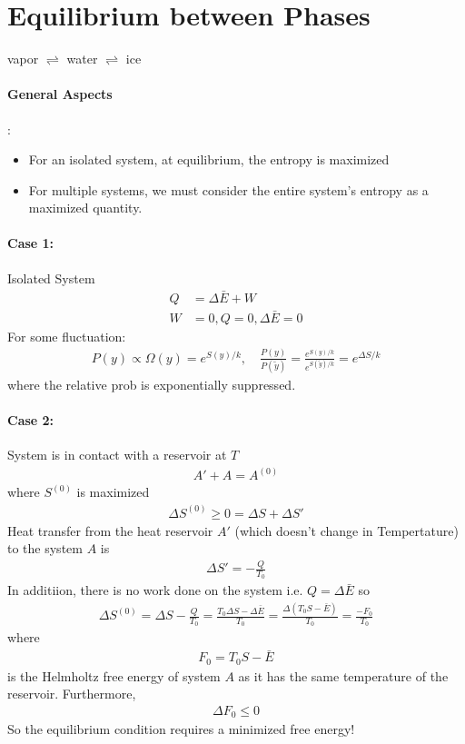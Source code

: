 \documentclass[../main.tex]{subfiles}
\begin{document}
\pagestyle{fancy}


\section{Equilibrium between Phases}
vapor $\rightleftharpoons$ water $\rightleftharpoons$ ice

\paragraph{General Aspects}:
\begin{itemize}
    \item For an isolated system, at equilibrium, the entropy is maximized
    \item For multiple systems, we must consider the entire system's entropy as a maximized quantity.
\end{itemize}

\paragraph{Case 1:} Isolated System
\begin{align*}
    Q &= \Delta \bar E + W \\
    W &= 0, Q = 0, \Delta \bar E = 0
\end{align*}
For some fluctuation:
\begin{align*}
    P(y) \propto \Omega (y) = e^{S(y)/k}, \quad
    \frac{P(y)}{P(\tilde y)} = \frac{e^{S(y)/k}}{e^{S(\tilde y)/k}} = e^{\Delta S/k}
\end{align*}
where the relative prob is exponentially suppressed.

\paragraph{Case 2:} System is in contact with a reservoir at $T$
\begin{align*}
    A' + A = A^{(0)}
\end{align*}
where $S^{(0)}$ is maximized
\begin{align*}
    \Delta S^{(0)} \geq 0 = \Delta S + \Delta S'
\end{align*}
Heat transfer from the heat reservoir $A'$ (which doesn't change in Tempertature) to the system $A$ is
\begin{align*}
    \Delta S' = -\frac{Q}{T_0}
\end{align*}
In additiion, there is no work done on the system i.e. $Q = \Delta \bar E$ so
\begin{align*}
    \Delta S^{(0)} = \Delta S - \frac{Q}{T_0} = \frac{T_0 \Delta S - \Delta \bar E}{T_0} = \frac{\Delta (T_0 S - \bar E)}{T_0} 
    = \frac{-F_0}{T_0}
\end{align*}
where
\begin{align*}
    F_0 = T_0 S - \bar E
\end{align*}
is the Helmholtz free energy of system $A$ as it has the same temperature of the reservoir. 
Furthermore,
\begin{align*}
    \Delta F_0 \leq 0
\end{align*}
So the equilibrium condition requires a minimized free energy!
\end{document}
